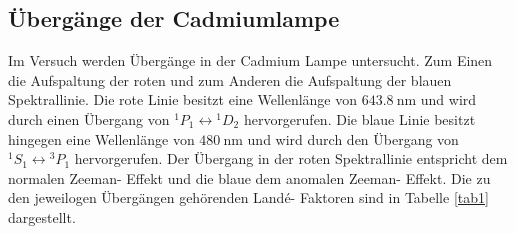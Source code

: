 \subsection{Übergänge der Cadmiumlampe}
Im Versuch werden Übergänge in der Cadmium Lampe untersucht. Zum Einen die Aufspaltung der roten
und zum Anderen die Aufspaltung der blauen Spektrallinie.
Die rote Linie besitzt eine Wellenlänge von $\SI{643,8}{\nano\meter}$ und wird durch einen
Übergang von ${}^1P_1\leftrightarrow{}^1D_2$ hervorgerufen. Die blaue Linie besitzt
hingegen eine Wellenlänge von $\SI{480}{\nano \meter}$ und wird durch den Übergang von
${}^1S_1\leftrightarrow{}^3P_1$ hervorgerufen.
Der Übergang in der roten Spektrallinie entspricht dem normalen Zeeman- Effekt und die
blaue dem anomalen Zeeman- Effekt.
Die zu den jeweilogen Übergängen gehörenden Landé- Faktoren sind in Tabelle \ref{tab1} dargestellt.
\FloatBarrier

